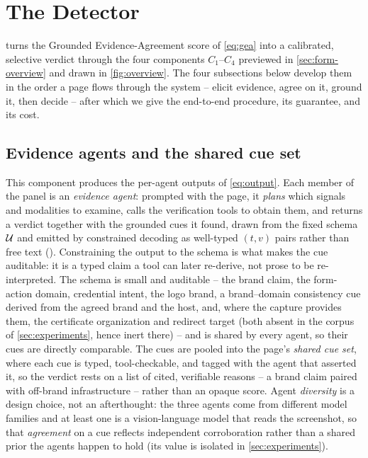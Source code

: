 \section{The \texorpdfstring{\toolname}{PhishProof} Detector}
\label{sec:method}

\toolname{} turns the Grounded Evidence-Agreement score of \eqref{eq:gea} into a
calibrated, selective verdict through the four components $C_1$--$C_4$ previewed in
\autoref{sec:form-overview} and drawn in \autoref{fig:overview}. The four subsections
below develop them in the order a page flows through the system -- elicit evidence,
agree on it, ground it, then decide -- after which we give the end-to-end procedure,
its guarantee, and its cost.

\subsection{Evidence agents and the shared cue set}
\label{sec:elicit}
This component produces the per-agent outputs of \eqref{eq:output}. Each member of the
panel is an \emph{evidence agent}: prompted with the page, it \emph{plans} which
signals and modalities to examine, calls the verification tools to obtain them, and
returns a verdict together with the grounded cues it found, drawn from the fixed schema
$\mathcal{U}$ and emitted by constrained decoding as well-typed $(t,v)$ pairs rather than
free text (). Constraining the output to the schema is what makes the cue
auditable: it is a typed claim a tool can later re-derive, not prose to be
re-interpreted. The schema is small and auditable -- the brand
claim, the form-action domain, credential intent, the logo brand, a brand--domain
consistency cue derived from the agreed brand and the host, and, where the capture
provides them, the certificate organization and redirect target (both absent in the
corpus of \autoref{sec:experiments}, hence inert there) -- and is shared by every agent, so their cues
are directly comparable. The cues are pooled into the page's \emph{shared cue set},
where each cue is typed, tool-checkable, and tagged with the agent that asserted it, so
the verdict rests on a list of cited, verifiable reasons -- a brand claim paired with
off-brand infrastructure -- rather than an opaque score. Agent \emph{diversity} is a
design choice, not an afterthought: the three agents come from different model families
and at least one is a vision-language model that reads the screenshot, so that
\emph{agreement} on a cue reflects independent corroboration rather than a shared prior
the agents happen to hold (its value is isolated in \autoref{sec:experiments}).

